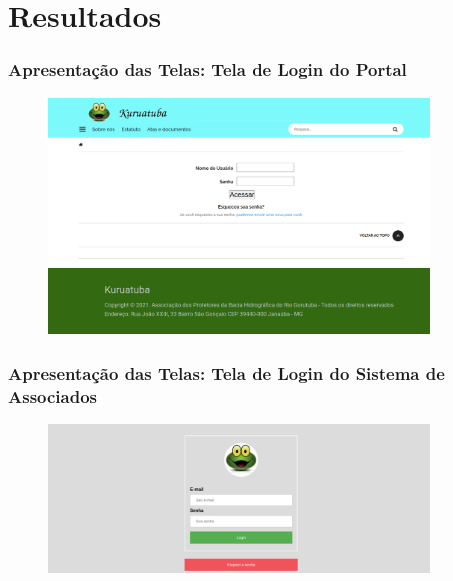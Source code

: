 \documentclass[xcolor=table]{beamer}
\begin{document}


\section{Resultados}
\begin{frame}
    \frametitle{Apresentação das Telas: Tela de Login do Portal}
    \begin{figure}[htb]
        \centering
        \includegraphics[width=0.9\textwidth]{../figuras/kuruatuba_portal_login.png}
        \label{fig:login-portal}
    \end{figure}
\end{frame}

\begin{frame}
    \frametitle{Apresentação das Telas: Tela de Login do Sistema de Associados}
    \begin{figure}[htb]
        \centering
        \includegraphics[width=0.9\textwidth]{../figuras/kuruatuba_sistema_login.png}
        \label{fig:login-sistema}
    \end{figure}
\end{frame}
\end{document}

